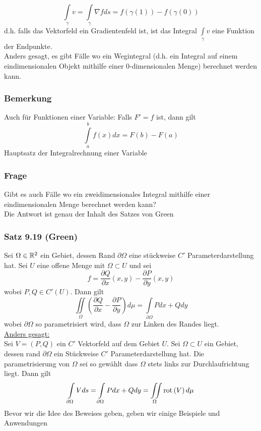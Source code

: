 \[\int\limits_\gamma  v  = \int\limits_\gamma  {\nabla fds = f\left( {\gamma \left( 1 \right)} \right) - } f\left( {\gamma \left( 0 \right)} \right)\]
d.h. falls das Vektorfeld ein Gradientenfeld ist, ist das Integral $\int\limits_\gamma  v $ eine Funktion der Endpunkte. \\

Anders gesagt, es gibt Fälle wo ein Wegintegral (d.h. ein Integral auf einem eindimensionalen Objekt mithilfe einer 0-dimensionalen Menge) berechnet werden kann.

\subsubsection*{Bemerkung}
Auch für Funktionen einer Variable: Falls $F'=f$ ist, dann gilt \[\int\limits_a^b {f(x)dx}  = F\left( b \right) - F\left( a \right)\] Hauptsatz der Integralrechnung einer Variable

\subsubsection*{Frage}
Gibt es auch Fälle wo ein zweidimensionales Integral mithilfe einer eindimensionalen Menge berechnet werden kann?\\

\noindent Die Antwort ist genau der Inhalt des Satzes von Green

\subsubsection*{Satz 9.19 (Green)}
Sei $\Omega \in\mathbb{R}^2$ ein Gebiet, dessen Rand $\partial\Omega$ eine stückweise $C'$ Parameterdarstellung hat. Sei $U$ eine offene Menge mit $\Omega\subset U$ und sei
\[ f=\frac{\partial Q}{\partial x}\left( x,y\right) -\frac{\partial P}{\partial y}\left( x,y\right) \]
wobei $P,Q\in C'\left( U\right)$. Dann gilt
\[ \iint\limits_\Omega \left(\frac{\partial Q}{\partial x}-\frac{\partial P}{\partial y}\right)d\mu = \int\limits_{\partial \Omega } {Pdx + Qdy} \]
wobei $\partial \Omega$ so parametrisiert wird, dass $\Omega$ zur Linken des Randes liegt. \\

\noindent\underline{Anders gesagt:}\\

\noindent Sei $V=\left( P,Q\right)$ ein $C'$ Vektorfeld auf dem Gebiet $U$. Sei $\Omega\subset U$ ein Gebiet, dessen rand $\partial\Omega$ ein Stückweise $C'$ Parameterdarstellung hat. Die parametrisierung von $\Omega$ sei so gewählt dass $\Omega$ stets links zur Durchlaufrichtung liegt. Dann gilt
\[\int\limits_{\partial \Omega } {Vds}  = \int\limits_{\partial \Omega } {Pdx + Qdy}  = \iint\limits_\Omega \operatorname{rot}\left( V \right)d\mu \]
Bevor wir die Idee des Beweises geben, geben wir einige Beispiele und Anwendungen

